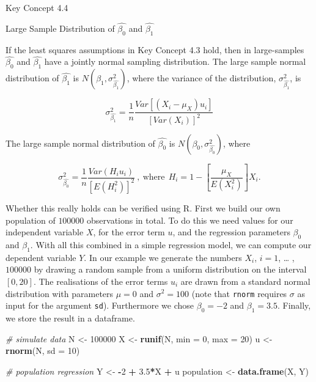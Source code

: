 \documentclass[]{book}
\newenvironment{Shaded}{\begin{snugshade}}{\end{snugshade}}
\newcommand{\KeywordTok}[1]{\textcolor[rgb]{0.13,0.29,0.53}{\textbf{#1}}}
\newcommand{\DataTypeTok}[1]{\textcolor[rgb]{0.13,0.29,0.53}{#1}}
\newcommand{\DecValTok}[1]{\textcolor[rgb]{0.00,0.00,0.81}{#1}}
\newcommand{\FloatTok}[1]{\textcolor[rgb]{0.00,0.00,0.81}{#1}}
\newcommand{\StringTok}[1]{\textcolor[rgb]{0.31,0.60,0.02}{#1}}
\newcommand{\CommentTok}[1]{\textcolor[rgb]{0.56,0.35,0.01}{\textit{#1}}}
\newcommand{\OperatorTok}[1]{\textcolor[rgb]{0.81,0.36,0.00}{\textbf{#1}}}
\newcommand{\NormalTok}[1]{#1}
\theoremstyle{definition}
\theoremstyle{definition}
\theoremstyle{definition}
\theoremstyle{remark}
\begin{document}
Key Concept 4.4

Large Sample Distribution of \(\hat{\beta_0}\) and \(\hat{\beta_1}\)

If the least squares assumptions in Key Concept 4.3 hold, then in
large-samples \(\hat{\beta_0}\) and \(\hat{\beta_1}\) have a jointly
normal sampling distribution. The large sample normal distribution of
\(\hat{\beta_1}\) is \(N(\beta_1, \sigma^2_\hat{\beta_1})\), where the
variance of the distribution, \(\sigma^2_\hat{\beta_1}\), is

\[ \sigma^2_\hat{\beta_1} = \frac{1}{n} \frac{Var \left[ \left(X_i - \mu_X \right) u_i  \right]}  {\left[  Var \left(X_i \right)  \right]^2} \tag{4.1} \]

The large sample normal distribution of \(\hat{\beta_0}\) is
\(N(\beta_0, \sigma^2_\hat{\beta_0})\), where

\[ \sigma^2_\hat{\beta_0} =  \frac{1}{n} \frac{Var \left( H_i u_i \right)}{ \left[  E \left(H_i^2  \right)  \right]^2 } \ , \ \text{where} \ \ H_i = 1 - \left[ \frac{\mu_X} {E \left( X_i^2\right)} \right] X_i. \tag{4.2} \]

Whether this really holds can be verified using R. First we build our
own population of \(100000\) observations in total. To do this we need
values for our independent variable \(X\), for the error term \(u\), and
the regression parameters \(\beta_0\) and \(\beta_1\). With all this
combined in a simple regression model, we can compute our dependent
variable \(Y\). In our example we generate the numbers \(X_i\),
\(i = 1\), \ldots{} ,\(100000\) by drawing a random sample from a
uniform distribution on the interval \([0,20]\). The realisations of the
error terms \(u_i\) are drawn from a standard normal distribution with
parameters \(\mu = 0\) and \(\sigma^2 = 100\) (note that \texttt{rnorm}
requires \(\sigma\) as input for the argument \texttt{sd}). Furthermore
we chose \(\beta_0 = -2\) and \(\beta_1 = 3.5\). Finally, we store the
result in a dataframe.

\begin{Shaded}
\begin{Highlighting}[]
\CommentTok{# simulate data}
\NormalTok{N <-}\StringTok{ }\DecValTok{100000}
\NormalTok{X <-}\StringTok{ }\KeywordTok{runif}\NormalTok{(N, }\DataTypeTok{min =} \DecValTok{0}\NormalTok{, }\DataTypeTok{max =} \DecValTok{20}\NormalTok{)}
\NormalTok{u <-}\StringTok{ }\KeywordTok{rnorm}\NormalTok{(N, }\DataTypeTok{sd =} \DecValTok{10}\NormalTok{)}

\CommentTok{# population regression}
\NormalTok{Y <-}\StringTok{ }\OperatorTok{-}\DecValTok{2} \OperatorTok{+}\StringTok{ }\FloatTok{3.5}\OperatorTok{*}\NormalTok{X }\OperatorTok{+}\StringTok{ }\NormalTok{u}
\NormalTok{population <-}\StringTok{ }\KeywordTok{data.frame}\NormalTok{(X, Y)}
\end{Highlighting}
\end{Shaded}
\end{document}
